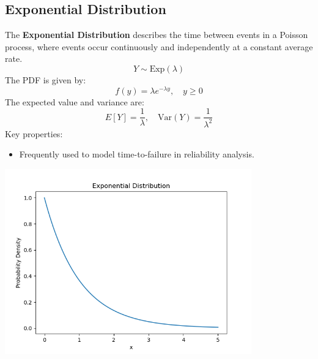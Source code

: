 \documentclass{article}
\begin{document}
\subsection{Exponential Distribution}
The \textbf{Exponential Distribution} describes the time between events in a Poisson process, where events occur continuously and independently at a constant average rate.
\[
Y \sim \text{Exp}(\lambda)
\]
The PDF is given by:
\[
f(y) = \lambda e^{-\lambda y}, \quad y \geq 0
\]
The expected value and variance are:
\[
E[Y] = \frac{1}{\lambda}, \quad \text{Var}(Y) = \frac{1}{\lambda^2}
\]
Key properties:
\begin{itemize}
    \item Frequently used to model time-to-failure in reliability analysis.
\end{itemize}
\begin{center}
    \includegraphics[width=0.8\textwidth]{./graphs/probDist/exponential_distribution.png}
\end{center}

\newpage
\end{document}
